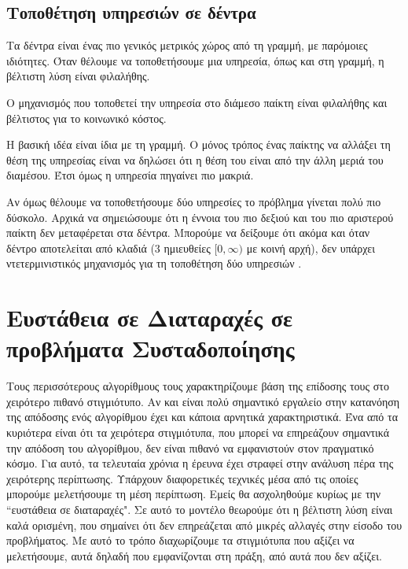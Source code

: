 \subsection*{Τοποθέτηση υπηρεσιών σε δέντρα}

Τα δέντρα είναι ένας πιο γενικός μετρικός χώρος από τη γραμμή, με παρόμοιες ιδιότητες. Όταν θέλουμε να τοποθετήσουμε μια υπηρεσία, όπως και στη γραμμή, η βέλτιστη λύση είναι φιλαλήθης.

\begin{theoremgr}
Ο μηχανισμός που τοποθετεί την υπηρεσία στο διάμεσο παίκτη είναι φιλαλήθης και βέλτιστος για το κοινωνικό κόστος.
\end{theoremgr}


Η βασική ιδέα είναι ίδια με τη γραμμή. Ο μόνος τρόπος ένας παίκτης να αλλάξει τη θέση της υπηρεσίας είναι να δηλώσει ότι η θέση του είναι από την άλλη μεριά του διαμέσου. Έτσι όμως η υπηρεσία πηγαίνει πιο μακριά.

Αν όμως θέλουμε να τοποθετήσουμε δύο υπηρεσίες το πρόβλημα γίνεται πολύ πιο δύσκολο. Αρχικά να σημειώσουμε ότι η έννοια του πιο δεξιού και του πιο αριστερού παίκτη δεν μεταφέρεται στα δέντρα. Μπορούμε να δείξουμε ότι ακόμα και όταν δέντρο αποτελείται από κλαδιά (3 ημιευθείες $[0,\infty)$ με κοινή αρχή), δεν υπάρχει ντετερμινιστικός μηχανισμός για τη τοποθέτηση δύο υπηρεσιών \cite{Fotakis2014}.




\section{Ευστάθεια σε Διαταραχές σε προβλήματα Συσταδοποίησης}

Τους περισσότερους αλγορίθμους τους χαρακτηρίζουμε βάση της επίδοσης τους στο χειρότερο πιθανό στιγμιότυπο. Αν και είναι πολύ σημαντικό εργαλείο στην κατανόηση της απόδοσης ενός αλγορίθμου έχει και κάποια αρνητικά χαρακτηριστικά. Ένα από τα κυριότερα είναι ότι τα χειρότερα στιγμιότυπα, που μπορεί να επηρεάζουν σημαντικά την απόδοση του αλγορίθμου, δεν είναι πιθανό να εμφανιστούν στον πραγματικό κόσμο. Για αυτό, τα τελευταία χρόνια η έρευνα έχει στραφεί στην ανάλυση πέρα της χειρότερης περίπτωσης. Υπάρχουν διαφορετικές τεχνικές μέσα από τις οποίες μπορούμε μελετήσουμε τη μέση περίπτωση. Εμείς θα ασχοληθούμε κυρίως με την ``ευστάθεια σε διαταραχές". Σε αυτό το μοντέλο θεωρούμε ότι η βέλτιστη λύση είναι καλά ορισμένη, που σημαίνει ότι δεν επηρεάζεται από μικρές αλλαγές στην είσοδο του προβλήματος. Με αυτό το τρόπο διαχωρίζουμε τα στιγμιότυπα που αξίζει να μελετήσουμε, αυτά δηλαδή που εμφανίζονται στη πράξη, από αυτά που δεν αξίζει.

